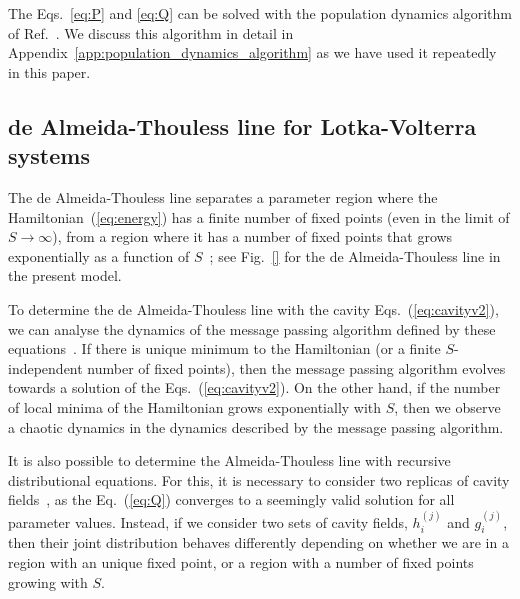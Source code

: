 \documentclass[11pt,a4paper]{article}
\begin{document}
The Eqs.~\eqref{eq:P} and \eqref{eq:Q} can be solved with the population dynamics algorithm of Ref.~\cite{mezard2001bethe}.  We discuss this algorithm in   detail  in Appendix~\ref{app:population_dynamics_algorithm} as we have used it repeatedly in this paper.  





\subsection{de Almeida-Thouless line for Lotka-Volterra systems}
\label{sec:almeida_thouless}
The de Almeida-Thouless line separates a parameter region where the Hamiltonian~(\ref{eq:energy}) has  a finite number of fixed points (even in the limit of $S\rightarrow \infty$),   from a region where it has a number of fixed points that grows exponentially as a function of $S$~\cite{de1978stability,del2024analytical}; see Fig.~\ref{} for the de Almeida-Thouless line in the present model.      %

To determine the  de Almeida-Thouless line with the cavity Eqs.~(\ref{eq:cavityv2}), we can  analyse the dynamics of the message passing algorithm defined by these equations~\cite{tonolo2025generalized}.  If there is unique  minimum to the Hamiltonian (or a finite $S$-independent number of fixed points), then the  message passing algorithm   evolves towards a  solution of the Eqs.~(\ref{eq:cavityv2}).  On the other hand, if the  number of local minima of the Hamiltonian  grows exponentially with $S$, then we observe a chaotic dynamics in the dynamics described by the message passing algorithm. 

It is also possible to determine the Almeida-Thouless line with recursive distributional equations.  For this, it is necessary to consider two replicas of cavity fields~\cite{aldous2005survey,neri2010phase}, as the Eq.~(\ref{eq:Q}) converges to a seemingly valid solution for all parameter values. 
Instead, if we consider two sets of cavity fields, $h^{(j)}_i$ and $g^{(j)}_i$, then their joint distribution behaves differently depending on whether we are in a region with an unique fixed point, or  a region with a number of fixed points growing with $S$.   
\end{document}
